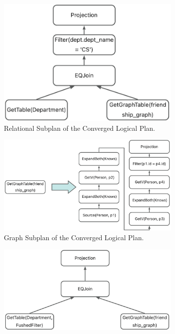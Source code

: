 \begin{figure}
    \centering
    \begin{subfigure}[b]{0.4\linewidth}
        \centering
        \includegraphics[width=\linewidth]{./figures/converged-logical-plan-relational.png}
        \caption{Relational Subplan of the Converged Logical Plan.}
        \label{fig:converged-logical-plan-relational}
    \end{subfigure}
    \begin{subfigure}[b]{0.4\linewidth}
        \centering
        \includegraphics[width=\linewidth]{./figures/converged-logical-plan-graph.png}
        \caption{Graph Subplan of the Converged Logical Plan.}
        \label{fig:converged-logical-plan-graph}
    \end{subfigure}
    \begin{subfigure}[b]{0.4\linewidth}
        \centering
        \includegraphics[width=\linewidth]{./figures/converged-logical-plan-relational-optimized.png}

\end{subfigure}
\end{figure}
